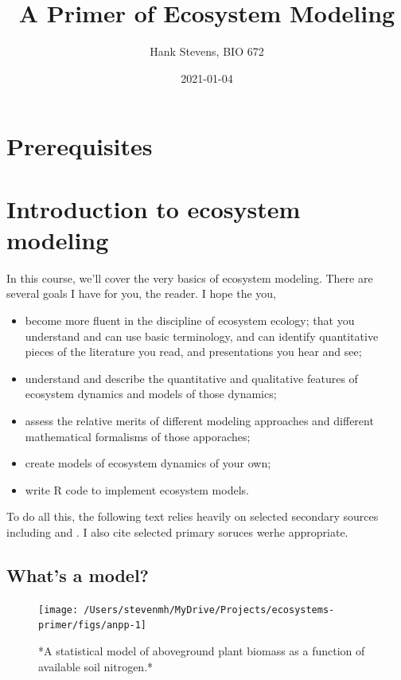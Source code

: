 \documentclass[
]{book}
\title{A Primer of Ecosystem Modeling}
\author{Hank Stevens, BIO 672}
\date{2021-01-04}
\providecommand{\tightlist}{%
  \setlength{\itemsep}{0pt}\setlength{\parskip}{0pt}}
\begin{document}
\maketitle

{
\setcounter{tocdepth}{1}
\tableofcontents
}
\hypertarget{prerequisites}{%
\chapter{Prerequisites}\label{prerequisites}}

\hypertarget{intro}{%
\chapter{Introduction to ecosystem modeling}\label{intro}}

In this course, we'll cover the very basics of ecosystem modeling. There are several goals I have for you, the reader. I hope the you,

\begin{itemize}
\tightlist
\item
  become more fluent in the discipline of ecosystem ecology; that you understand and can use basic terminology, and can identify quantitative pieces of the literature you read, and presentations you hear and see;
\item
  understand and describe the quantitative and qualitative features of ecosystem dynamics and models of those dynamics;
\item
  assess the relative merits of different modeling approaches and different mathematical formalisms of those apporaches;
\item
  create models of ecosystem dynamics of your own;
\item
  write R code to implement ecosystem models.
\end{itemize}

To do all this, the following text relies heavily on selected secondary sources including \citet{Soetaert2009} and \citet{Haefner1996}. I also cite selected primary soruces werhe appropriate.

\hypertarget{whats-a-model}{%
\section{What's a model?}\label{whats-a-model}}

\begin{figure}
\texttt{[image: /Users/stevenmh/MyDrive/Projects/ecosystems-primer/figs/anpp-1]} \caption{*A statistical model of aboveground plant biomass as a function of available soil nitrogen.*}\label{fig:anpp}
\end{figure}
\end{document}
